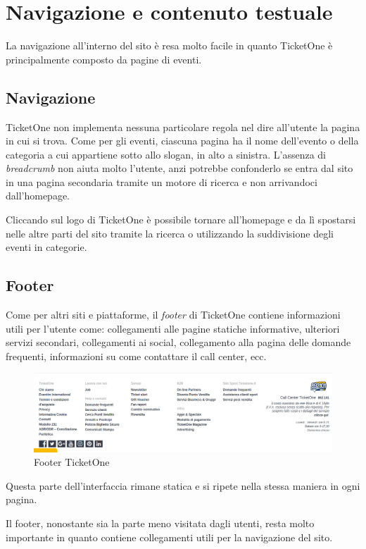 \section{Navigazione e contenuto testuale}\label{contenav}

La navigazione all'interno del sito è resa molto facile in quanto TicketOne è principalmente composto da pagine di eventi.

\subsection{Navigazione}
	TicketOne non implementa nessuna particolare regola nel dire all'utente la pagina in cui si trova.
	Come per gli eventi, ciascuna pagina ha il nome dell'evento o della categoria a cui appartiene sotto allo slogan, in alto a sinistra.
	L'assenza di \textit{breadcrumb} non aiuta molto l'utente, anzi potrebbe confonderlo se entra dal sito in una pagina secondaria tramite un motore di ricerca e non arrivandoci dall'homepage.
	\par Cliccando sul logo di TicketOne è possibile tornare all'homepage e da lì spostarsi nelle altre parti del sito tramite la ricerca o utilizzando la suddivisione degli eventi in categorie.

\subsection{Footer}
	Come per altri siti e piattaforme, il \textit{footer} di TicketOne contiene informazioni utili per l'utente come: collegamenti alle pagine statiche informative, ulteriori servizi secondari, collegamenti ai social, collegamento alla pagina delle domande frequenti, informazioni su come contattare il call center, ecc.

	\begin{figure}[hbt]
		\centering
		\includegraphics[width=\textwidth]{img/footer.png}
		\caption{Footer TicketOne}
		\label{footer}
	\end{figure}

	Questa parte dell'interfaccia rimane statica e si ripete nella stessa maniera in ogni pagina.
	\par Il footer, nonostante sia la parte meno visitata dagli utenti, resta molto importante in quanto contiene collegamenti utili per la navigazione del sito.


